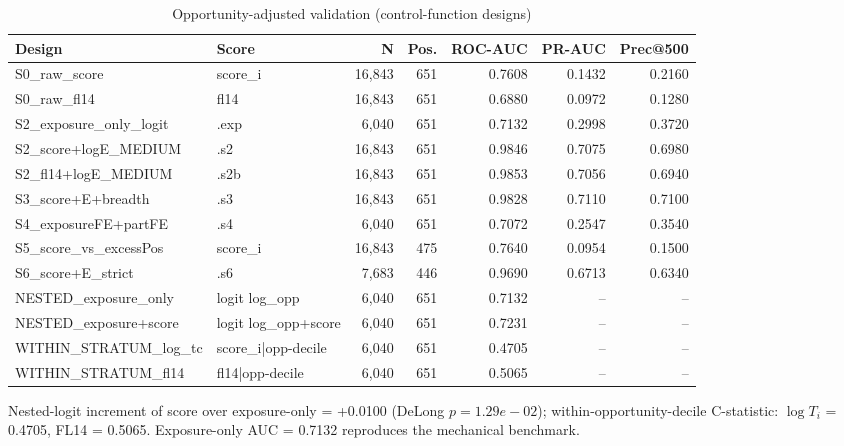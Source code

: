 \begin{table}[htbp]\centering
\caption{Opportunity-adjusted validation (control-function designs)}
\label{tab:opp_adjusted_validation}
\begin{tabular}{llrrrrr}\hline
Design & Score & N & Pos. & ROC-AUC & PR-AUC & Prec@500 \\\hline
S0\_raw\_score & score\_i & 16,843 & 651 & 0.7608 & 0.1432 & 0.2160 \\
S0\_raw\_fl14 & fl14 & 16,843 & 651 & 0.6880 & 0.0972 & 0.1280 \\
S2\_exposure\_only\_logit & .exp &  6,040 & 651 & 0.7132 & 0.2998 & 0.3720 \\
S2\_score+logE\_MEDIUM & .s2 & 16,843 & 651 & 0.9846 & 0.7075 & 0.6980 \\
S2\_fl14+logE\_MEDIUM & .s2b & 16,843 & 651 & 0.9853 & 0.7056 & 0.6940 \\
S3\_score+E+breadth & .s3 & 16,843 & 651 & 0.9828 & 0.7110 & 0.7100 \\
S4\_exposureFE+partFE & .s4 &  6,040 & 651 & 0.7072 & 0.2547 & 0.3540 \\
S5\_score\_vs\_excessPos & score\_i & 16,843 & 475 & 0.7640 & 0.0954 & 0.1500 \\
S6\_score+E\_strict & .s6 &  7,683 & 446 & 0.9690 & 0.6713 & 0.6340 \\
NESTED\_exposure\_only & logit log\_opp &  6,040 & 651 & 0.7132 & -- & -- \\
NESTED\_exposure+score & logit log\_opp+score &  6,040 & 651 & 0.7231 & -- & -- \\
WITHIN\_STRATUM\_log\_tc & score\_i|opp-decile &  6,040 & 651 & 0.4705 & -- & -- \\
WITHIN\_STRATUM\_fl14 & fl14|opp-decile &  6,040 & 651 & 0.5065 & -- & -- \\
\hline\end{tabular}
\begin{tablenotes}\footnotesize\item Nested-logit increment of score over exposure-only = +0.0100 (DeLong $p=1.29e-02$); within-opportunity-decile C-statistic: $\log T_i$ = 0.4705, FL14 = 0.5065. Exposure-only AUC = 0.7132 reproduces the mechanical benchmark.\end{tablenotes}
\end{table}
